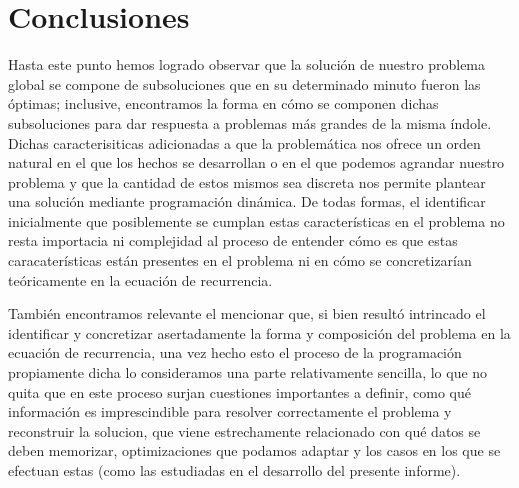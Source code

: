 \section{Conclusiones}
Hasta este punto hemos logrado observar que la solución de nuestro problema global se compone de subsoluciones que en su determinado minuto fueron las óptimas; inclusive, encontramos la forma en cómo se componen dichas subsoluciones para dar respuesta a problemas más grandes de la misma índole. Dichas caracterisiticas adicionadas a que la problemática nos ofrece un orden natural en el que los hechos se desarrollan o en el que podemos agrandar nuestro problema y que la cantidad de estos mismos sea discreta nos permite plantear una solución mediante programación dinámica. De todas formas, el identificar inicialmente que posiblemente se cumplan estas características en el problema no resta importacia ni complejidad al proceso de entender cómo es que estas caracaterísticas están presentes en el problema ni en cómo se concretizarían teóricamente en la ecuación de recurrencia.



También encontramos relevante el mencionar que, si bien resultó intrincado el identificar y concretizar asertadamente la forma y composición del problema en la ecuación de recurrencia, una vez hecho esto el proceso de la programación propiamente dicha lo consideramos una parte relativamente sencilla, lo que no quita que en este proceso surjan cuestiones importantes a definir, como qué información es imprescindible para resolver correctamente el problema y reconstruir la solucion, que viene estrechamente relacionado con qué datos se deben memorizar, optimizaciones que podamos adaptar y los casos en los que se efectuan estas (como las estudiadas en el desarrollo del presente informe). 